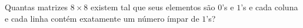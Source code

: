 Quantas matrizes $8 \times 8$ existem tal que seus elementos são $0$’s e $1$’s e cada coluna e cada linha contém exatamente um número ímpar de $1$'s?
